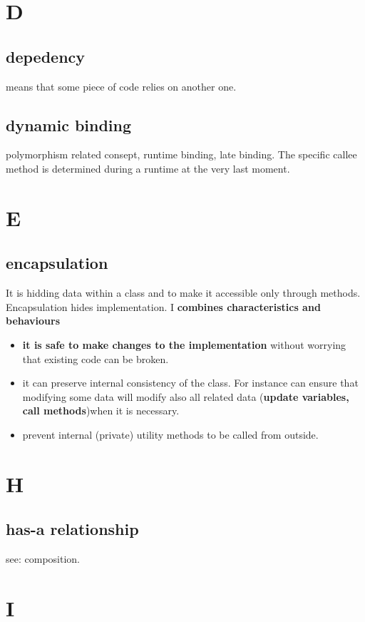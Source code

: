 \documentclass{report}
\begin{document}
\section{D}

\subsection{depedency}
means that some piece of code relies on another one.

\subsection{dynamic binding}
polymorphism related consept, runtime binding, late binding. The specific callee method is determined during a runtime at the very last moment.


\section{E}

\subsection{encapsulation}
It is hidding data within a class and to make it accessible only through methods. Encapsulation
hides implementation. I \textbf{combines characteristics and behaviours}
\begin{itemize}
	\item \textbf{it is safe to make changes to the implementation}
	without worrying that existing code can be broken.
	\item it can preserve internal consistency of the class. For instance can ensure that modifying some data
	will modify also all related data (\textbf{update variables, call methods})when it is necessary.
	\item prevent internal (private) utility methods to be called from outside.
\end{itemize}


\section{H}

\subsection{has-a relationship}
see: composition.


\section{I}
\end{document}
